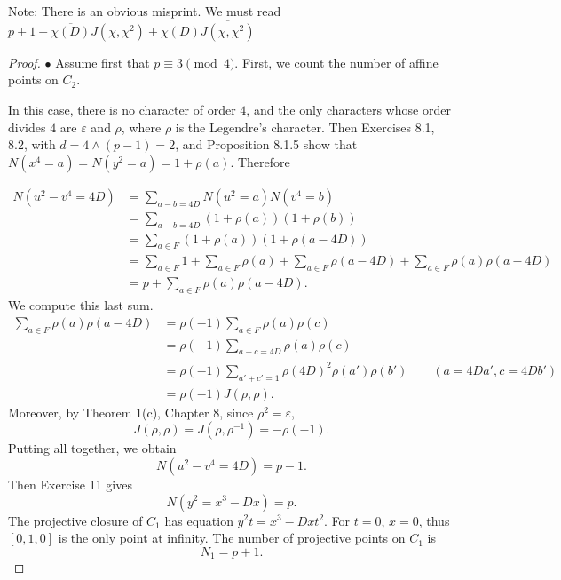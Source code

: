 \documentclass[11pt,a4paper]{article}
\begin{document}
Note: There is an obvious misprint. We must read $p+1 + \overline{\chi(D)} J(\chi,\chi^2) + \chi(D) \overline{J(\chi,\chi^2)}$
\begin{proof} 

$\bullet$ Assume first that $p\equiv 3 \pmod 4$. First, we count the number of affine points on $C_2$. 

In this case, there is no character of order $4$, and the only characters whose order divides $4$ are $\varepsilon$ and $\rho$, where $\rho$ is the Legendre's character. Then Exercises 8.1, 8.2,  with $d = 4 \wedge (p-1) = 2$, and Proposition 8.1.5 show that $N(x^4 = a) = N(y^2 =a) = 1 + \rho(a).$ Therefore


\begin{align*}
N(u^2 - v^4 = 4D) &= \sum_{a-b = 4D} N(u^2=a)N(v^4=b)\\
&=\sum_{a-b = 4D} (1+\rho(a))(1+\rho(b))\\
&=\sum_{a \in F} (1+ \rho(a))(1+ \rho(a-4D))\\
&= \sum_{a \in F} 1 + \sum_{a \in F} \rho(a) + \sum_{a \in F} \rho(a-4D) + \sum_{a\in F}\rho(a) \rho(a-4D)\\
&= p + \sum_{a\in F}\rho(a) \rho(a-4D).
\end{align*}
We compute this last sum.
\begin{align*}
\sum_{a\in F}\rho(a) \rho(a-4D) &= \rho(-1) \sum_{a \in F} \rho(a) \rho(c)\\
&= \rho(-1) \sum_{a+ c = 4D} \rho(a) \rho(c)\\
&= \rho(-1) \sum_{a'+c' = 1} \rho(4D)^2 \rho(a') \rho(b')\qquad (a = 4Da', c = 4Db')\\
&= \rho(-1) J(\rho,\rho).
\end{align*}
Moreover, by Theorem 1(c), Chapter 8, since $\rho^2 = \varepsilon$,
$$J(\rho,\rho) = J(\rho, \rho^{-1}) = -\rho(-1).$$
Putting all together, we obtain
$$N(u^2 - v^4 = 4D) = p-1.$$
Then Exercise 11 gives
$$N(y^2 = x^3 -Dx) = p.$$
The projective closure of $C_1$ has equation $y^2 t =x^3 - Dxt^2$. For $t=0$, $x=0$, thus $[0,1,0]$ is the only point at infinity. The number of projective points on $C_1$ is
$$N_1 = p+1.$$

\bigskip


\end{proof}
\end{document}

